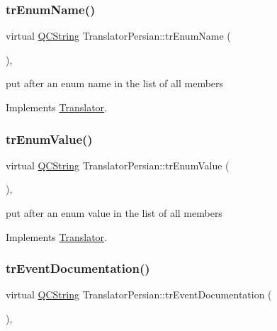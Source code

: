 \subsubsection{\texorpdfstring{trEnumName()}{trEnumName()}}
{\footnotesize\ttfamily virtual \mbox{\hyperlink{class_q_c_string}{Q\+C\+String}} Translator\+Persian\+::tr\+Enum\+Name (\begin{DoxyParamCaption}{ }\end{DoxyParamCaption})\hspace{0.3cm}{\ttfamily [inline]}, {\ttfamily [virtual]}}

put after an enum name in the list of all members 

Implements \mbox{\hyperlink{class_translator}{Translator}}.

\mbox{\label{class_translator_persian_a1e6cb470865f7b249733ffccedfc7fd2}} 
\subsubsection{\texorpdfstring{trEnumValue()}{trEnumValue()}}
{\footnotesize\ttfamily virtual \mbox{\hyperlink{class_q_c_string}{Q\+C\+String}} Translator\+Persian\+::tr\+Enum\+Value (\begin{DoxyParamCaption}{ }\end{DoxyParamCaption})\hspace{0.3cm}{\ttfamily [inline]}, {\ttfamily [virtual]}}

put after an enum value in the list of all members 

Implements \mbox{\hyperlink{class_translator}{Translator}}.

\mbox{\label{class_translator_persian_ad03ee316255eccb66cdeac5ebd27d194}} 
\subsubsection{\texorpdfstring{trEventDocumentation()}{trEventDocumentation()}}
{\footnotesize\ttfamily virtual \mbox{\hyperlink{class_q_c_string}{Q\+C\+String}} Translator\+Persian\+::tr\+Event\+Documentation (\begin{DoxyParamCaption}{ }\end{DoxyParamCaption})\hspace{0.3cm}{\ttfamily [inline]}, {\ttfamily [virtual]}}

